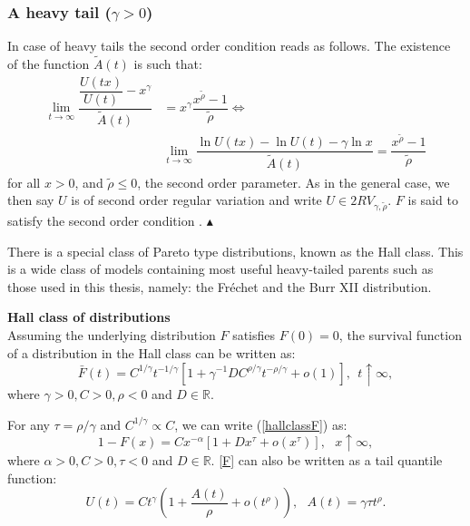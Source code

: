 \subsubsection*{A heavy tail ($\gamma>0$)}
In case of heavy tails the second order condition reads as follows. The existence of the function $\tilde{A}(t)$ is such that:
\begin{equation}
\begin{array}{ll}
\lim\limits_{t\rightarrow\infty}\dfrac{\dfrac{U(tx)}{U(t)}-x^{\gamma}}{\tilde{A}(t)}&=x^{\gamma}\dfrac{x^{\tilde{\rho}}-1}{\tilde{\rho}}\Longleftrightarrow\\& \lim\limits_{t\rightarrow\infty}\dfrac{\ln U(tx)-\ln U(t)-\gamma\ln x}{\tilde{A}(t)}=\dfrac{x^{\tilde{\rho}}-1}{\tilde{\rho}}
\end{array}
\end{equation}
for all $x>0$, and $\tilde{\rho}\leq 0$, the second order parameter. As in the general case, we then say $U$ is of second order regular variation and write $U\in 2RV_{\gamma,\tilde{\rho}}$. $F$ is said to satisfy the second order condition \citep{alves2007note}.
\hspace*{\fill}$\blacktriangle$

There is a special class of Pareto type distributions, known as the Hall class. This is a wide class of models containing most useful heavy-tailed parents such as those used in this thesis, namely: the Fréchet and the Burr XII distribution.\\
\begin{definition}\label{hall}\textnormal{\textbf{Hall class of distributions}}\ \\
	Assuming the underlying distribution $F$ satisfies $F(0)=0$, the survival function of a distribution in the Hall class \citep{hall,welsh} can be written as:
	\begin{equation}\label{hallclassF}
		\bar{F}(t)=C^{1/\gamma}t^{-1/\gamma}[1+\gamma^{-1}DC^{\rho/\gamma}t^{-\rho/\gamma}+o(1)],\ \ t\uparrow \infty, 
	\end{equation} where $\gamma >0, C>0, \rho<0$ and $D\in\mathbb{R}$.\\
\end{definition}

For any $\tau=\rho/\gamma$ and $C^{1/\gamma}\propto C$, we can write (\ref{hallclassF}) as:
\begin{equation}\label{F}
	1-F(x)=Cx^{-\alpha}[1+Dx^{\tau}+o(x^\tau)],\ \ \ x\uparrow \infty, 
\end{equation} where $\alpha >0, C>0, \tau<0$ and $D\in\mathbb{R}$.
\autoref{F} can also be written as a tail quantile function: \begin{equation}
	U(t)=Ct^{\gamma}\left(1+\dfrac{A(t)}{\rho}+o(t^{\rho})\right),\ \ \ A(t)=\gamma\tau t^{\rho}.
\end{equation}

